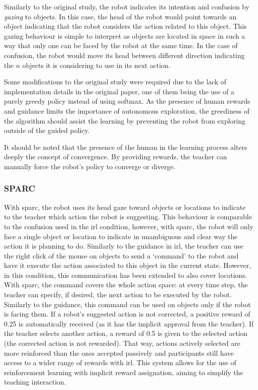 Similarly to the original study, the robot indicates its intention and confusion by \emph{gazing} to objects. In this case, the head of the robot would point towards an object indicating that the robot considers the action related to this object. This gazing behaviour is simple to interpret as objects are located in space in such a way that only one can be faced by the robot at the same time. In the case of confusion, the robot would move its head between different direction indicating the $n$ objects it is considering to use in its next action.

Some modifications to the original study were required due to the lack of implementation details in the original paper, one of them being the use of a purely greedy policy instead of using softmax. As the presence of human rewards and guidance limits the importance of autonomous exploration, the greediness of the algorithm should assist the learning by preventing the robot from exploring outside of the guided policy. 

It should be noted that the presence of the human in the learning process alters deeply the concept of convergence. By providing rewards, the teacher can manually force the robot's policy to converge or diverge.

\subsubsection{SPARC}

With \gls{sparc}, the robot uses its head gaze toward objects or locations to indicate to the teacher which action the robot is suggesting. This behaviour is comparable to the confusion used in the \gls{irl} condition, however, with \gls{sparc}, the robot will only face a single object or location to indicate in unambiguous and clear way the action it is planning to do. Similarly to the guidance in \gls{irl}, the teacher can use the right click of the mouse on objects to send a `command' to the robot and have it execute the action associated to this object in the current state. However, in this condition, this communication has been extended to also cover locations. With \gls{sparc}, the command covers the whole action space: at every time step, the teacher can specify, if desired, the next action to be executed by the robot. Similarly to the guidance, this command can be used on objects only if the robot is facing them. If a robot's suggested action is not corrected, a positive reward of 0.25 is automatically received (as it has the implicit approval from the teacher). If the teacher selects another action, a reward of 0.5 is given to the selected action (the corrected action is not rewarded). That way, actions actively selected are more reinforced than the ones accepted passively and participants still have access to a wider range of rewards with \gls{irl}. This system allows for the use of reinforcement learning with implicit reward assignation, aiming to simplify the teaching interaction.

